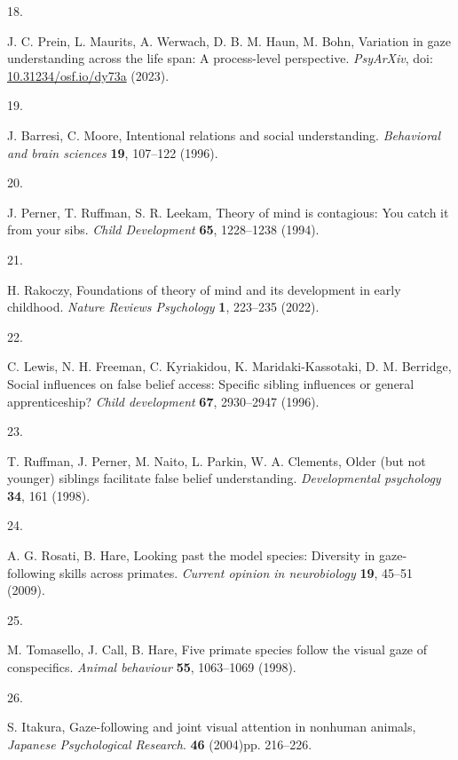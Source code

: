 \documentclass[
  man,floatsintext]{apa6}
\newlength{\cslhangindent}
\newlength{\csllabelwidth}
\newlength{\cslentryspacingunit} %
\newenvironment{CSLReferences}[2] %
 {%
  \setlength{\parindent}{0pt}
  \ifodd #1
  \let\oldpar\par
  \def\par{\hangindent=\cslhangindent\oldpar}
  \fi
  \setlength{\parskip}{#2\cslentryspacingunit}
 }%
 {}
\newcommand{\CSLLeftMargin}[1]{\parbox[t]{\csllabelwidth}{#1}}
\newcommand{\CSLRightInline}[1]{\parbox[t]{\linewidth - \csllabelwidth}{#1}\break}
\begin{document}
\begin{CSLReferences}{0}{0}
\leavevmode{}%
\CSLLeftMargin{18. }%
\CSLRightInline{J. C. Prein, L. Maurits, A. Werwach, D. B. M. Haun, M. Bohn, Variation in gaze understanding across the life span: {A} process-level perspective. \emph{{PsyArXiv}}, doi: \href{https://doi.org/10.31234/osf.io/dy73a}{10.31234/osf.io/dy73a} (2023).}

\leavevmode{}%
\CSLLeftMargin{19. }%
\CSLRightInline{J. Barresi, C. Moore, Intentional relations and social understanding. \emph{Behavioral and brain sciences} \textbf{19}, 107--122 (1996).}

\leavevmode{}%
\CSLLeftMargin{20. }%
\CSLRightInline{J. Perner, T. Ruffman, S. R. Leekam, Theory of mind is contagious: You catch it from your sibs. \emph{Child Development} \textbf{65}, 1228--1238 (1994).}

\leavevmode{}%
\CSLLeftMargin{21. }%
\CSLRightInline{H. Rakoczy, Foundations of theory of mind and its development in early childhood. \emph{Nature Reviews Psychology} \textbf{1}, 223--235 (2022).}

\leavevmode{}%
\CSLLeftMargin{22. }%
\CSLRightInline{C. Lewis, N. H. Freeman, C. Kyriakidou, K. Maridaki-Kassotaki, D. M. Berridge, Social influences on false belief access: Specific sibling influences or general apprenticeship? \emph{Child development} \textbf{67}, 2930--2947 (1996).}

\leavevmode{}%
\CSLLeftMargin{23. }%
\CSLRightInline{T. Ruffman, J. Perner, M. Naito, L. Parkin, W. A. Clements, Older (but not younger) siblings facilitate false belief understanding. \emph{Developmental psychology} \textbf{34}, 161 (1998).}

\leavevmode{}%
\CSLLeftMargin{24. }%
\CSLRightInline{A. G. Rosati, B. Hare, Looking past the model species: Diversity in gaze-following skills across primates. \emph{Current opinion in neurobiology} \textbf{19}, 45--51 (2009).}

\leavevmode{}%
\CSLLeftMargin{25. }%
\CSLRightInline{M. Tomasello, J. Call, B. Hare, Five primate species follow the visual gaze of conspecifics. \emph{Animal behaviour} \textbf{55}, 1063--1069 (1998).}

\leavevmode{}%
\CSLLeftMargin{26. }%
\CSLRightInline{S. Itakura, Gaze-following and joint visual attention in nonhuman animals, \emph{Japanese Psychological Research}. \textbf{46} (2004)pp. 216--226.}

\end{CSLReferences}
\end{document}
